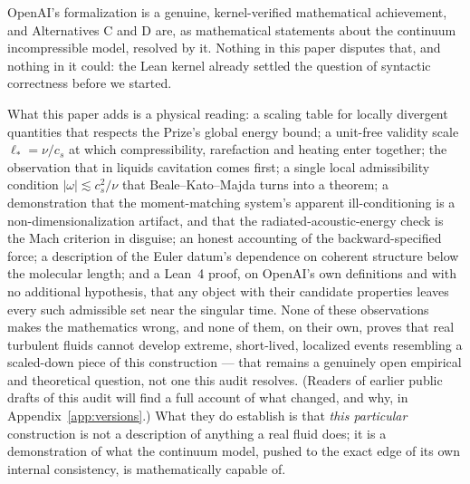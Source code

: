 \documentclass[11pt,a4paper]{article}
\begin{document}
OpenAI's formalization is a genuine, kernel-verified mathematical achievement, and Alternatives C
and D are, as mathematical statements about the continuum incompressible model, resolved by it.
Nothing in this paper disputes that, and nothing in it could: the Lean kernel already settled the
question of syntactic correctness before we started.

What this paper adds is a physical reading: a scaling table for locally divergent quantities that
respects the Prize's global energy bound; a unit-free validity scale $\ell_*=\nu/c_s$ at which
compressibility, rarefaction and heating enter together; the observation that in liquids cavitation
comes first; a single local admissibility condition $|\omega|\lesssim c_s^2/\nu$ that
Beale--Kato--Majda turns into a theorem; a demonstration that the moment-matching system's apparent
ill-conditioning is a non-dimensionalization artifact, and that the radiated-acoustic-energy check
is the Mach criterion in disguise; an honest accounting of the backward-specified force; a
description of the Euler datum's dependence on coherent structure below the molecular length; and a
Lean~4 proof, on OpenAI's own definitions and with no additional hypothesis, that any object with
their candidate properties leaves every such admissible set near the singular time. None
of these observations makes the mathematics wrong, and none of them, on their own, proves that real
turbulent fluids cannot develop extreme, short-lived, localized events resembling a scaled-down
piece of this construction --- that remains a genuinely open empirical and theoretical question, not
one this audit resolves. (Readers of earlier public drafts of this audit will find a full account of
what changed, and why, in Appendix~\ref{app:versions}.) What they do establish is that
\emph{this particular} construction is not a description of anything a real fluid does; it is a
demonstration of what the continuum model, pushed to the exact edge of its own internal
consistency, is mathematically capable of.
\end{document}
